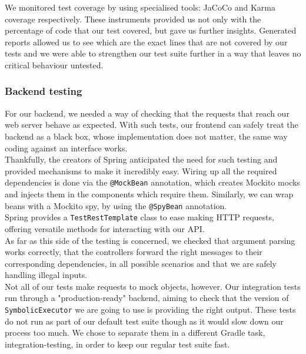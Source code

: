\documentclass[titlepage,11pt]{article}
\begin{document}
\noindent We monitored test coverage by using specialised tools: JaCoCo \cite{jacoco}and Karma coverage respectively. These instruments provided us not only with the percentage of code that our test covered, but gave us further insights. Generated reports allowed us to see which are the exact lines that are not covered by our tests and we were able to strengthen our test suite further in a way that leaves no critical behaviour untested.

\subsubsection{Backend testing}

For our backend, we needed a way of checking that the requests that reach our web server behave as expected. With such tests, our frontend can safely treat the backend as a black box, whose implementation does not matter, the same way coding against an interface works. \\

\noindent Thankfully, the creators of Spring anticipated the need for such testing and provided mechanisms to make it incredibly easy. Wiring up all the required dependencies is done via the \texttt{@MockBean} annotation, which creates Mockito mocks and injects them in the components which require them. Similarly, we can wrap beans with a Mockito spy, by using the \texttt{@SpyBean} annotation. \\

\noindent Spring provides a \texttt{TestRestTemplate} class to ease making HTTP requests, offering versatile methods for interacting with our API. \\

\noindent As far as this side of the testing is concerned, we checked that argument parsing works correctly, that the controllers forward the right messages to their corresponding dependencies, in all possible scenarios and that we are safely handling illegal inputs. \\

\noindent Not all of our tests make requests to mock objects, however. Our integration tests run through a "production-ready" backend, aiming to check that the version of \texttt{SymbolicExecutor} we are going to use is providing the right output. These tests do not run as part of our default test suite though as it would slow down our process too much. We chose to separate them in a different Gradle task, integration-testing, in order to keep our regular test suite fast. \\
\end{document}
